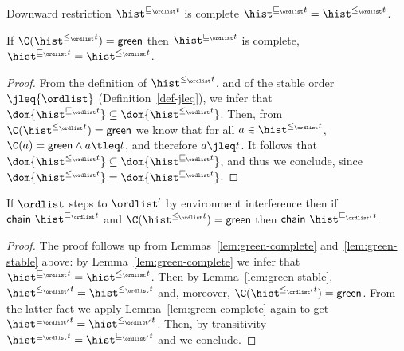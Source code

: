 
\begin{definition}[Complete]\label{def:complete}
Downward restriction $\chainjleq{t}{\ordlist}$ is {\sf complete} \Iff
$\chainjleq{t}{\ordlist} = \chaintleq{t}{\ordlist}$.
\end{definition}

\begin{lemma}\label{lem:green-complete}
  If $\C(\chaintleq{t}{\ordlist}) = {\sf green}$ then
  $\chainjleq{t}{\ordlist}$ is {\sf complete},
  \ie $\chainjleq{t}{\ordlist} = \chaintleq{t}{\ordlist}$.
\end{lemma}

\begin{proof}
From the definition of $\chaintleq{t}{\ordlist}$, and of the stable
order $\jleq{\ordlist}$ (Definition~\ref{def-jleq}), we infer that
$\dom{\chainjleq{t}{\ordlist}} \subseteq
\dom{\chaintleq{t}{\ordlist}}$. Then, from
$\C(\chaintleq{t}{\ordlist}) = {\sf green}$ we know that for all $a
\in \chaintleq{t}{\ordlist}$, $\C(a) = {\sf green} \wedge a \tleq t$,
and therefore $ a \jleq t$. It follows that
$\dom{\chaintleq{t}{\ordlist}} \subseteq
\dom{\chainjleq{t}{\ordlist}}$, and thus we conclude, since
$\dom{\chaintleq{t}{\ordlist}} = \dom{\chainjleq{t}{\ordlist}}$.
\end{proof}


\begin{lemma}%
\label{lem:chain-stable}%
If $\ordlist$ steps to $\ordlist'$ by environment interference then
if $\mathsf{chain}\ \chainjleq{t}{\ordlist}$ and
$\C(\chaintleq{t}{\ordlist}) = {\sf green}$ then
$\mathsf{chain}\ \chainjleq{t}{\ordlist'}$.
\end{lemma}

\begin{proof}
The proof follows up from Lemmas~\ref{lem:green-complete}
and~\ref{lem:green-stable} above: by Lemma~\ref{lem:green-complete} we
infer that $\chainjleq{t}{\ordlist} = \chaintleq{t}{\ordlist}$. Then
by Lemma~\ref{lem:green-stable}, $\chaintleq{t}{\ordlist'} =
\chaintleq{t}{\ordlist}$ and, moreover, $\C(\chaintleq{t}{\ordlist'})
= {\sf green}$. From the latter fact we apply
Lemma~\ref{lem:green-complete} again to get $\chainjleq{t}{\ordlist'}
= \chaintleq{t}{\ordlist'}$. Then, by transitivity
$\chainjleq{t}{\ordlist} = \chainjleq{t}{\ordlist'}$ and we conclude.
\end{proof}

